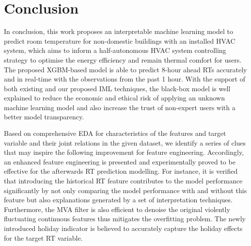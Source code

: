 \documentclass[11pt]{article}
\begin{document}
\section{Conclusion}
In conclusion, this work proposes an interpretable machine learning model to predict room temperature for non-domestic buildings with an installed HVAC system, which aims to inform a half-autonomous HVAC system controlling strategy to optimise the energy efficiency and remain thermal comfort for users. The proposed XGBM-based model is able to predict 8-hour ahead RTs accurately and in real-time with the observations from the past 1 hour. With the support of both existing and our proposed IML techniques, the black-box model is well explained to reduce the economic and ethical risk of applying an unknown machine learning model and also increase the trust of non-expert users with a better model transparency.

Based on comprehensive EDA for characteristics of the features and target variable and their joint relations in the given dataset, we identify a series of clues that may inspire the following improvement for feature engineering. Accordingly, an enhanced feature engineering is presented and experimentally proved to be effective for the afterwards RT prediction modelling. For instance, it is verified that introducing the historical RT feature contributes to the model performance significantly by not only comparing the model performance with and without this feature but also explanations generated by a set of interpretation techniques. Furthermore, the MVA filter is also efficient to denoise the original violently fluctuating continuous features thus mitigates the overfitting problem. The newly introduced holiday indicator is believed to accurately capture the holiday effects for the target RT variable.
\end{document}
